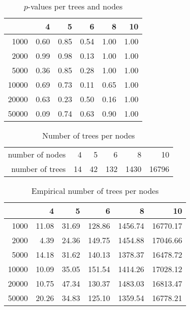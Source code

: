 \begin{table}[ht]
  \begin{center}
    \begin{tabular}{rrrrrr}
      \hline
      & 4 & 5 & 6 & 8 & 10 \\ 
      \hline
      1000 & 0.60 & 0.85 & 0.54 & 1.00 & 1.00 \\ 
      2000 & 0.99 & 0.98 & 0.13 & 1.00 & 1.00 \\ 
      5000 & 0.36 & 0.85 & 0.28 & 1.00 & 1.00 \\ 
      10000 & 0.69 & 0.73 & 0.11 & 0.65 & 1.00 \\ 
      20000 & 0.63 & 0.23 & 0.50 & 0.16 & 1.00 \\ 
      50000 & 0.09 & 0.74 & 0.63 & 0.90 & 1.00 \\ 
      \hline
    \end{tabular}
    \caption{$p$-values per trees and nodes}
    \label{table:p-values-per-nodes}
  \end{center}
\end{table}
\begin{table}[ht]
  \label{table:catalan-numbers}
  \begin{center}
    \begin{tabular}{rrrrrr}
      \hline
      number of nodes & 4 & 5 & 6 & 8 & 10 \\ 
      number of trees & 14 & 42 & 132 & 1430 & 16796 \\ 
      \hline
    \end{tabular}
    \caption{Number of trees per nodes}
  \end{center}
\end{table}
\begin{table}[ht]
  \begin{center}
    \begin{tabular}{rrrrrr}
      \hline
      & 4 & 5 & 6 & 8 & 10 \\ 
      \hline
      1000 & 11.08 & 31.69 & 128.86 & 1456.74 & 16770.17 \\ 
      2000 & 4.39 & 24.36 & 149.75 & 1454.88 & 17046.66 \\ 
      5000 & 14.18 & 31.62 & 140.13 & 1378.37 & 16478.72 \\ 
      10000 & 10.09 & 35.05 & 151.54 & 1414.26 & 17028.12 \\ 
      20000 & 10.75 & 47.34 & 130.37 & 1483.03 & 16813.47 \\ 
      50000 & 20.26 & 34.83 & 125.10 & 1359.54 & 16778.21 \\ 
      \hline
    \end{tabular}
    \caption{Empirical number of trees per nodes}
    \label{table:empirical-trees-per-nodes}
  \end{center}
\end{table}
